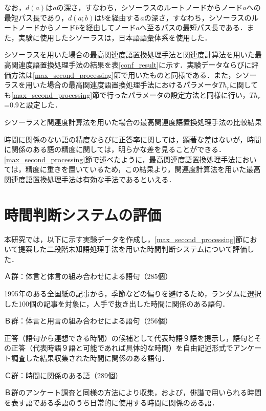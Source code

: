 なお，$d(a)$は$a$の深さ，すなわち，シソーラスのルートノードからノード$a$への最短パス長であり，$d(a;b)$は$b$を経由する$a$の深さ，すなわち，シソーラスのルートノードからノード$b$を経由してノード$a$へ至るパスの最短パス長である．また，実験に使用したシソーラスは，日本語語彙体系\cite{ntt:97}を使用した．

シソーラスを用いた場合の最高関連度語置換処理手法と関連度計算法を用いた最高関連度語置換処理手法の結果を表\ref{conf_result}に示す．実験データならびに評価方法は\ref{max_second_processing}節で用いたものと同様である．また，シソーラスを用いた場合の最高関連度語置換処理手法におけるパラメータ$Th_r$に関しても\ref{max_second_processing}節で行ったパラメータの設定方法と同様に行い，$Th_r$=0.9と設定した．

\begin{table}[t]
\caption{シソーラスと関連度計算法を用いた場合の最高関連度語置換処理手法の比較結果}
\label{conf_result}
\end{table}

時間に関係のない語の精度ならびに正答率に関しては，顕著な差はないが，時間に関係のある語の精度に関しては，明らかな差を見ることができる．\ref{max_second_processing}節で述べたように，最高関連度語置換処理手法においては，精度に重きを置いているため，この結果より，関連度計算法を用いた最高関連度語置換処理手法は有効な手法であるといえる．


\section{時間判断システムの評価}

本研究では，以下に示す実験データを作成し，\ref{max_second_processing}節において提案した二段階未知語処理手法を用いた時間判断システムについて評価した．


Ａ群：体言と体言の組み合わせによる語句（285個）

1995年のある全国紙の記事から，季節などの偏りを避けるため，ランダムに選択した100個の記事を対象に，人手で抜き出した時間に関係のある語句．

Ｂ群：体言と用言の組み合わせによる語句（256個）

正答（語句から連想できる時間）の候補として代表時語９語を提示し，語句とその正答（代表時語９語と可能であれば具体的な時間）を自由記述形式でアンケート調査した結果収集された時間に関係のある語句．

Ｃ群：時間に関係のある語（289個）

Ｂ群のアンケート調査と同様の方法により収集，および，俳諧で用いられる時間を表す語である季語のうち日常的に使用する時間に関係のある語．


